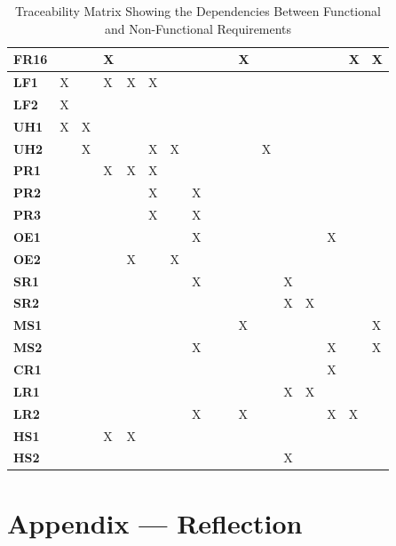 \documentclass[12pt]{article}
\begin{document}
{\begin{landscape}
\begin{table}[h!]
\begin{tabular}{|p{1cm}|p{0.9cm}|p{0.9cm}|p{0.9cm}|p{0.9cm}|p{0.9cm}|p{0.9cm}|p{0.9cm}|p{0.9cm}|p{0.9cm}|p{0.9cm}|p{0.9cm}|p{0.9cm}|p{0.9cm}|p{0.9cm}|p{0.9cm}|p{0.9cm}|}
\hline
\textbf{FR16} & & & X & & & & & & & X & & & & & X & X \\ 
\hline
\textbf{LF1} & X & & X & X & X & & & & & & & & & & & \\ 
\hline
\textbf{LF2} & X & & & & & & & & & & & & & & & \\ 
\hline
\textbf{UH1} & X & X & & & & & & & & & & & & & & \\ 
\hline
\textbf{UH2} & & X & & & X & X & & & & & X & & & & & \\ 
\hline
\textbf{PR1} & & & X & X & X & & & & & & & & & & & \\ 
\hline
\textbf{PR2} & & & & & X & & X & & & & & & & & & \\ 
\hline
\textbf{PR3} & & & & & X & & X & & & & & & & & & \\ 
\hline
\textbf{OE1} & & & & & & & X & & & & & & & X & & \\ 
\hline
\textbf{OE2} & & & & X & & X & & & & & & & & & & \\ 
\hline
\textbf{SR1} & & & & & & & X & & & & & X & & & & \\ 
\hline
\textbf{SR2} & & & & & & & & & & & & X & X & & & \\ 
\hline
\textbf{MS1} & & & & & & & & & & X & & & & & & X \\ 
\hline
\textbf{MS2} & & & & & & & X & & & & & & & X & & X \\ 
\hline
\textbf{CR1} & & & & & & & & & & & & & & X & & \\ 
\hline
\textbf{LR1} & & & & & & & & & & & & X & X & & & \\ 
\hline
\textbf{LR2} & & & & & & & X & & & X & & & & X & X & \\ 
\hline
\textbf{HS1} & & & X & X & & & & & & & & & & & & \\ 
\hline
\textbf{HS2} & & & & & & & & & & & & X & & & & \\ 
\hline
\end{tabular}
\caption{Traceability Matrix Showing the Dependencies Between Functional and Non-Functional Requirements}
\label{Table:Traceability}
\end{table}
\end{landscape}
}
\newpage{}
\section*{Appendix --- Reflection}
\end{document}
